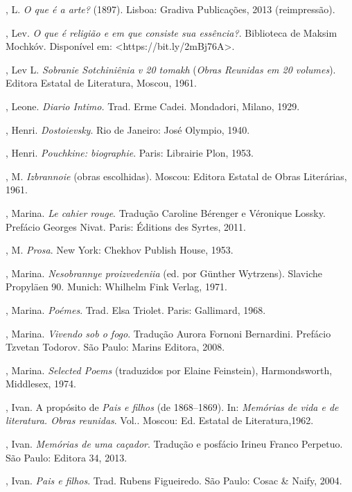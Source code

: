 \begin{Parskip}
, L. \emph{O que é a arte?} (1897). Lisboa: Gradiva Publicações, 2013 (reimpressão).

, Lev. \emph{O que é religião e em que consiste sua essência?}. Biblioteca de Maksim Mochkóv.
Disponível em: \textless{}https://bit.ly/2mBj76A\textgreater{}.

, Lev L. \emph{Sobranie Sotchiniênia v 20 tomakh} (\emph{Obras
Reunidas em 20 volumes}). Editora Estatal de Literatura, Moscou, 1961.

, Leone. \emph{Diario Intimo.} Trad. Erme Cadei. Mondadori,
Milano, 1929.

, Henri. \emph{Dostoievsky}. Rio de Janeiro: José Olympio, 1940.

, Henri. \emph{Pouchkine: biographie}. Paris: Librairie Plon,
1953.

, M. \emph{Izbrannoie} (obras escolhidas). Moscou: Editora
Estatal de Obras Literárias, 1961.

, Marina. \emph{Le cahier rouge}. Tradução Caroline Bérenger e Véronique Lossky. Prefácio
Georges Nivat. Paris: Éditions des Syrtes, 2011.

, M. \emph{Prosa}. New York: Chekhov Publish House, 1953.

, Marina. \emph{Nesobrannye proizvedeniia} (ed. por Günther Wytrzens). Slaviche Propyläen 90. Munich: Whilhelm Fink Verlag, 1971.

, Marina. \emph{Poémes}. Trad. Elsa Triolet. Paris: Gallimard, 1968.

, Marina. \emph{Vivendo sob o fogo}. Tradução Aurora Fornoni Bernardini. Prefácio Tzvetan Todorov. São Paulo: Marins Editora, 2008.

, Marina. \emph{Selected Poems} (traduzidos por Elaine
Feinstein), Harmondsworth, Middlesex, 1974.

, Ivan. A propósito de \emph{Pais e filhos} (de 1868--1869). In: \emph{Memórias de vida e de literatura. Obras reunidas}. Vol.. Moscou: Ed. Estatal de Literatura,1962.

, Ivan. \emph{Memórias de uma caçador}. Tradução e posfácio Irineu Franco Perpetuo. São Paulo: Editora 34, 2013.

, Ivan. \emph{Pais e filhos}. Trad. Rubens Figueiredo. São
Paulo: Cosac \& Naify, 2004.


\end{Parskip}
